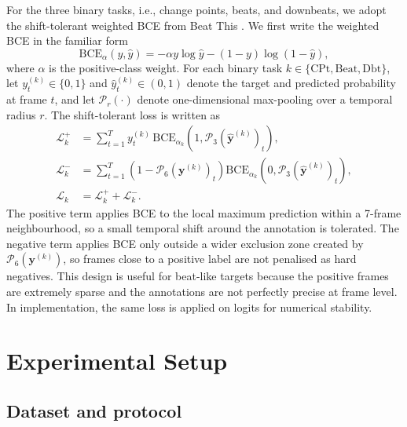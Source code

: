 For the three binary tasks, i.e., change points, beats, and downbeats, we adopt the shift-tolerant weighted BCE from Beat This \cite{foscarin2024beat}. We first write the weighted BCE in the familiar form
\begin{equation}
\mathrm{BCE}_{\alpha}(y,\hat{y}) = -\alpha y\log \hat{y} -(1-y)\log(1-\hat{y}),
\label{eq:audiodyn_bce_component}
\end{equation}
where $\alpha$ is the positive-class weight. For each binary task $k \in \{\mathrm{CPt},\mathrm{Beat},\mathrm{Dbt}\}$, let $y_t^{(k)} \in \{0,1\}$ and $\hat{y}_t^{(k)} \in (0,1)$ denote the target and predicted probability at frame $t$, and let $\mathcal{P}_{r}(\cdot)$ denote one-dimensional max-pooling over a temporal radius $r$. The shift-tolerant loss is written as
\begin{align}
\mathcal{L}_{k}^{+}
&=
\sum_{t=1}^{T}
y_t^{(k)}\,\mathrm{BCE}_{\alpha_k}\!\left(1,\mathcal{P}_{3}(\hat{\mathbf{y}}^{(k)})_t\right),
\label{eq:audiodyn_shift_bce_pos}\\
\mathcal{L}_{k}^{-}
&=
\sum_{t=1}^{T}
\left(1-\mathcal{P}_{6}(\mathbf{y}^{(k)})_t\right)
\mathrm{BCE}_{\alpha_k}\!\left(0,\mathcal{P}_{3}(\hat{\mathbf{y}}^{(k)})_t\right),
\label{eq:audiodyn_shift_bce_neg}\\
\mathcal{L}_{k}
&=
\mathcal{L}_{k}^{+}+\mathcal{L}_{k}^{-}.
\label{eq:audiodyn_shift_bce}
\end{align}
The positive term applies BCE to the local maximum prediction within a 7-frame neighbourhood, so a small temporal shift around the annotation is tolerated. The negative term applies BCE only outside a wider exclusion zone created by $\mathcal{P}_{6}(\mathbf{y}^{(k)})$, so frames close to a positive label are not penalised as hard negatives. This design is useful for beat-like targets because the positive frames are extremely sparse and the annotations are not perfectly precise at frame level. In implementation, the same loss is applied on logits for numerical stability.

\section{Experimental Setup}
\label{sec:audiodyn_exp}

\subsection{Dataset and protocol}
\label{ssec:audiodyn_data}

